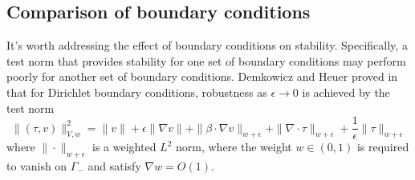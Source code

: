 \documentclass[11pt,onecolumn]{scrartcl}
\newcommand{\grad}{\nabla}
\renewcommand{\div}{\grad \cdot}
\begin{document}
\subsection{Comparison of boundary conditions}

It's worth addressing the effect of boundary conditions on stability.  Specifically, a test norm that provides stability for one set of boundary conditions may perform poorly for another set of boundary conditions.  Demkowicz and Heuer proved in \cite{DPGrobustness} that for Dirichlet boundary conditions, robustness as $\epsilon \rightarrow 0$ is achieved by the test norm
\[
\|\left(\tau, v\right)\|_{V,w}^2 = \|v\| + \epsilon \|\grad v\| + \|\beta \cdot \grad v\|_{w+\epsilon} + \| \div \tau\|_{w+\epsilon} + \frac{1}{\epsilon}\|\tau\|_{w+\epsilon}
\]
where $\|\cdot \|_{w+\epsilon}$ is a weighted $L^2$ norm, where the weight $w \in (0,1)$ is required to vanish on $\Gamma_-$ and satisfy $\grad w = O(1)$.  
\end{document}

